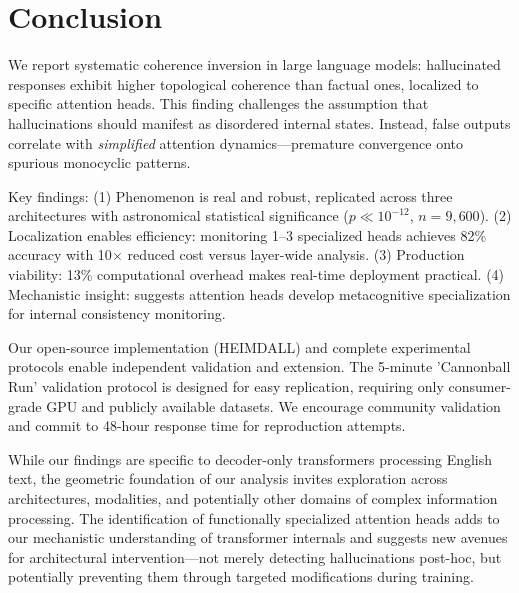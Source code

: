 \documentclass[11pt,twocolumn]{article}
\begin{document}
\section{Conclusion}

We report systematic coherence inversion in large language models: hallucinated responses exhibit higher topological coherence than factual ones, localized to specific attention heads. This finding challenges the assumption that hallucinations should manifest as disordered internal states. Instead, false outputs correlate with \textit{simplified} attention dynamics---premature convergence onto spurious monocyclic patterns.

Key findings: (1) Phenomenon is real and robust, replicated across three architectures with astronomical statistical significance ($p \ll 10^{-12}$, $n=9{,}600$). (2) Localization enables efficiency: monitoring 1--3 specialized heads achieves 82\% accuracy with 10$\times$ reduced cost versus layer-wide analysis. (3) Production viability: 13\% computational overhead makes real-time deployment practical. (4) Mechanistic insight: suggests attention heads develop metacognitive specialization for internal consistency monitoring.

Our open-source implementation (HEIMDALL) and complete experimental protocols enable independent validation and extension. The 5-minute 'Cannonball Run' validation protocol is designed for easy replication, requiring only consumer-grade GPU and publicly available datasets. We encourage community validation and commit to 48-hour response time for reproduction attempts.

While our findings are specific to decoder-only transformers processing English text, the geometric foundation of our analysis invites exploration across architectures, modalities, and potentially other domains of complex information processing. The identification of functionally specialized attention heads adds to our mechanistic understanding of transformer internals and suggests new avenues for architectural intervention---not merely detecting hallucinations post-hoc, but potentially preventing them through targeted modifications during training.

\end{document}
